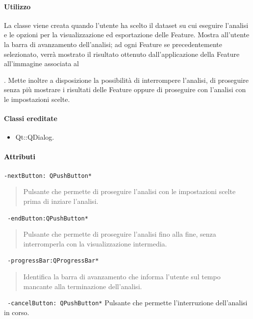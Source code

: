 \paragraph{Utilizzo\\}
La classe viene creata quando l'utente ha scelto il dataset\g{} su cui eseguire l'analisi e le opzioni per la visualizzazione ed esportazione delle Feature\g{}. Mostra all'utente la barra di avanzamento dell'analisi; ad ogni Feature\g{} se precedentemente selezionato, verrà mostrato il risultato ottenuto dall'applicazione della Feature\g{} all'immagine associata al \subject{}. Mette inoltre a disposizione la possibilità di interrompere l'analisi, di proseguire senza più mostrare i risultati delle Feature\g{} oppure di proseguire con l'analisi con le impostazioni scelte.
\paragraph{Classi ereditate\\}
\begin{itemize}
\item Qt::QDialog.
\end{itemize}

\paragraph{\textcolor{black}{Attributi\\}}
\color{teal}\verb!-nextButton: QPushButton*!
\color{black}
\begin{quote}Pulsante che permette di proseguire l'analisi con le impostazioni scelte prima di inziare l'analisi.
\end{quote}
\color{teal}\verb! -endButton:QPushButton*!
\color{black} 
\begin{quote}Pulsante che permette di proseguire l'analisi fino alla fine, senza interromperla con la visualizzazione intermedia.
\end{quote}
\color{teal}\verb! -progressBar:QProgressBar*!
\color{black} 
\begin{quote}Identifica la barra di avanzamento che informa l'utente sul tempo mancante alla terminazione dell'analisi.
\end{quote}
\color{teal}\verb! -cancelButton: QPushButton*!
\color{black}Pulsante che permette l'interruzione dell'analisi in corso.
